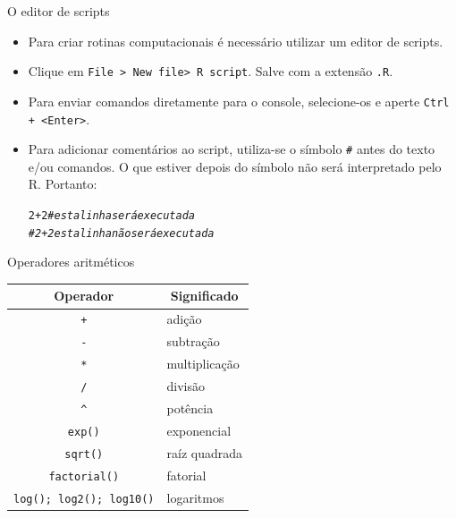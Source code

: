 \documentclass[10pt,handout]{beamer}\usepackage[]{graphicx}\usepackage[]{color}
\makeatletter
\newcommand{\hlnum}[1]{\textcolor[rgb]{0.686,0.059,0.569}{#1}}%
\newcommand{\hlcom}[1]{\textcolor[rgb]{0.678,0.584,0.686}{\textit{#1}}}%
\newcommand{\hlopt}[1]{\textcolor[rgb]{0,0,0}{#1}}%
\newenvironment{kframe}{%
 \def\at@end@of@kframe{}%
 \ifinner\ifhmode%
  \def\at@end@of@kframe{\end{minipage}}%
  \begin{minipage}{\columnwidth}%
 \fi\fi%
 \def\FrameCommand##1{\hskip\@totalleftmargin \hskip-\fboxsep
 \colorbox{shadecolor}{##1}\hskip-\fboxsep
     \hskip-\linewidth \hskip-\@totalleftmargin \hskip\columnwidth}%
 \MakeFramed {\advance\hsize-\width
   \@totalleftmargin\z@ \linewidth\hsize
   \@setminipage}}%
 {\par\unskip\endMakeFramed%
 \at@end@of@kframe}
\newenvironment{knitrout}{}{} %
\makeatother
\begin{document}
\begin{frame}[fragile]{O editor de scripts}
  \begin{itemize}
  \item Para criar rotinas computacionais é necessário utilizar um editor
    de scripts.
  \item Clique em \texttt{File > New file> R script}. Salve com a extensão
    \texttt{.R}.
  \item Para enviar comandos diretamente para o console, selecione-os e
    aperte \texttt{Ctrl + <Enter>}.
  \item Para adicionar comentários ao script, utiliza-se o símbolo
    \texttt{\#} antes do texto e/ou comandos. O que estiver depois do
    símbolo não será interpretado pelo R. Portanto:
\begin{knitrout}\small
{}\color{fgcolor}\begin{kframe}
\begin{alltt}
\hlnum{2} \hlopt{+} \hlnum{2}     \hlcom{# esta linha será executada}
\hlcom{# 2 + 2     esta linha não será executada}
\end{alltt}
\end{kframe}
\end{knitrout}
\end{itemize}
\end{frame}


\begin{frame}[fragile]{Operadores aritméticos}
\begin{table}[!ht]
    \centering
        \begin{tabular}{cl}
        \hline
        \multicolumn{0}{c}{Operador} & \multicolumn{1}{c}{Significado} \\
        \hline
        \verb|+| & adição \\
        \verb|-| & subtração \\
        \verb|*| & multiplicação \\
        \verb|/| & divisão \\
        \verb|^| & potência \\
        \verb|exp()| & exponencial \\
        \verb|sqrt()| & raíz quadrada \\
        \verb|factorial()| & fatorial \\
        \verb|log(); log2(); log10()| & logaritmos \\
        \hline
        \end{tabular}
\end{table}
\end{frame}
\end{document}
